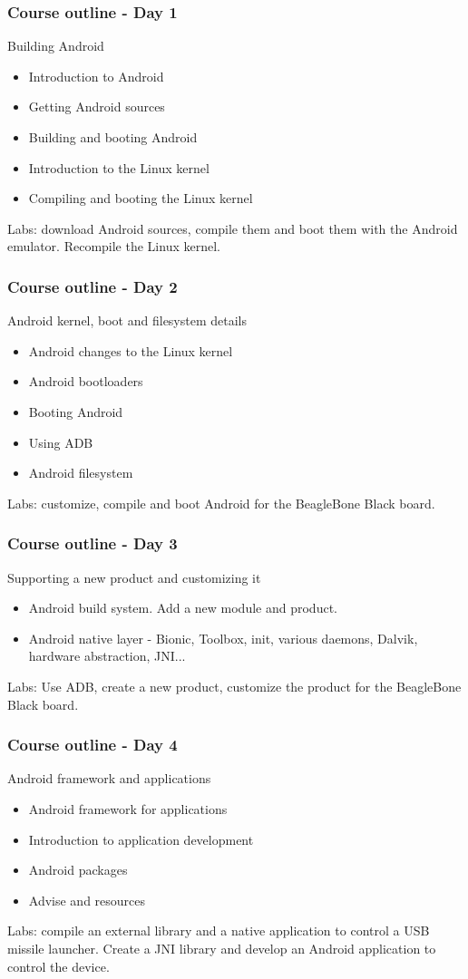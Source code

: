\begin{frame}
\frametitle{Course outline - Day 1}
Building Android
\begin{itemize}
\item Introduction to Android
\item Getting Android sources
\item Building and booting Android
\item Introduction to the Linux kernel 
\item Compiling and booting the Linux kernel 
\end{itemize}
Labs: download Android sources, compile them and boot them with the
Android emulator. Recompile the Linux kernel.
\end{frame}

\begin{frame}
\frametitle{Course outline - Day 2}
Android kernel, boot and filesystem details
\begin{itemize}
\item Android changes to the Linux kernel
\item Android bootloaders
\item Booting Android
\item Using ADB
\item Android filesystem
\end{itemize}
Labs: customize, compile and boot Android for the BeagleBone Black board. 
\end{frame}

\begin{frame}
\frametitle{Course outline - Day 3}
Supporting a new product and customizing it
\begin{itemize}
\item Android build system. Add a new module and product.
\item Android native layer - Bionic, Toolbox, init, various daemons,
Dalvik, hardware abstraction, JNI...
\end{itemize}
Labs: Use ADB, create a new product, customize the product for the
BeagleBone Black board.
\end{frame}

\begin{frame}
\frametitle{Course outline - Day 4}
Android framework and applications
\begin{itemize}
\item Android framework for applications
\item Introduction to application development
\item Android packages
\item Advise and resources
\end{itemize}
Labs: compile an external library and a native application to control a
USB missile launcher. Create a JNI library and develop an Android
application to control the device.
\end{frame}
